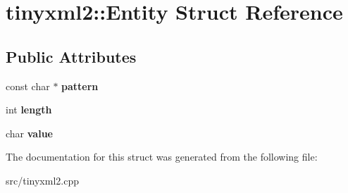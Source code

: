 \hypertarget{structtinyxml2_1_1_entity}{}\section{tinyxml2\+:\+:Entity Struct Reference}
\label{structtinyxml2_1_1_entity}
\subsection*{Public Attributes}
\begin{DoxyCompactItemize}
\item 
\hypertarget{structtinyxml2_1_1_entity_ab330f5d665d29bfc811ecfa76315894b}{}const char $\ast$ {\bfseries pattern}\label{structtinyxml2_1_1_entity_ab330f5d665d29bfc811ecfa76315894b}

\item 
\hypertarget{structtinyxml2_1_1_entity_a25e2b57cb59cb4fa68f283d7cb570f21}{}int {\bfseries length}\label{structtinyxml2_1_1_entity_a25e2b57cb59cb4fa68f283d7cb570f21}

\item 
\hypertarget{structtinyxml2_1_1_entity_a7334e81e33b4615655a403711b24f3ed}{}char {\bfseries value}\label{structtinyxml2_1_1_entity_a7334e81e33b4615655a403711b24f3ed}

\end{DoxyCompactItemize}


The documentation for this struct was generated from the following file\+:\begin{DoxyCompactItemize}
\item 
src/tinyxml2.\+cpp\end{DoxyCompactItemize}
